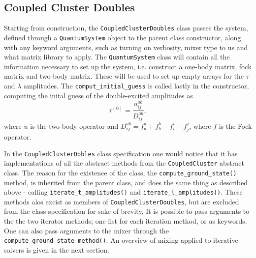     \subsection{Coupled Cluster Doubles}
    
    Starting from construction, the \lstinline{CoupledClusterDoubles} class passes 
    the system, defined through a \lstinline{QuantumSystem} object to the 
    parent class constructor, along with any keyword arguments, such as turning 
    on verbosity, mixer type to us and what matrix library to apply. The
    \lstinline{QuantumSystem} class will contain all the information necessary to 
    set up the system, i.e. construct a one-body matrix, fock matrix and two-body 
    matrix. These will be used to set up empty arrays for the $\tau$ and $\lambda$ 
    amplitudes. The \lstinline{comput_initial_guess} is called lastly in the 
    constructor, computing the inital guess of the double-excited amplitudes as 
    \begin{equation}
        \label{eq:ccd_inital_guess}
        \tau^{(0)} = \frac{u^{ab}_{ij}}{D^{ab}_{ij}},
    \end{equation}
    where $u$ is the two-body operator and
    $D^{ab}_{ij} = f^a_a + f^b_b - f^i_i - f^j_j$,
    where $f$ is the Fock operator.
    
    In the \lstinline{CoupledClusterDobles} class specification one would
    notice that it has implementations of all the abstract methods 
    from the \lstinline{CoupledCluster} abstract class. The reason for the existence 
    of the class, the \lstinline{compute_ground_state()} method, is inherited from the 
    parent class, and does the same thing as described above - calling 
    \lstinline{iterate_t_amplitudes()} and \lstinline{iterate_l_amplitudes()}. These 
    methods alos excist as members of \lstinline{CoupledClusterDoubles}, but are excluded 
    from the class specification for sake of brevity. It is 
    possible to pass arguments to the the two iterator methods; one list for each iteration
    method, or as keywords.
    One can also pass arguments 
    to the mixer through the \lstinline{compute_ground_state_method()}. 
    An overview of mixing applied to iterative solvers is given in the next 
    section.

